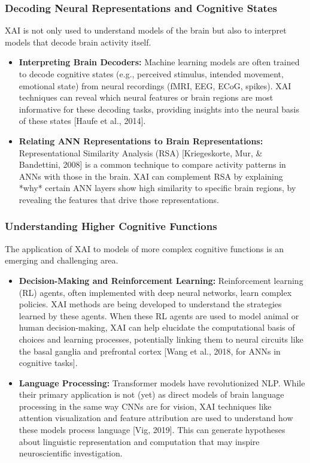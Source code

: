 \documentclass[11pt,a4paper]{article}
\begin{document}
\subsubsection{Decoding Neural Representations and Cognitive States}
XAI is not only used to understand models of the brain but also to interpret models that decode brain activity itself.
\begin{itemize}
    \item \textbf{Interpreting Brain Decoders:} Machine learning models are often trained to decode cognitive states (e.g., perceived stimulus, intended movement, emotional state) from neural recordings (fMRI, EEG, ECoG, spikes). XAI techniques can reveal which neural features or brain regions are most informative for these decoding tasks, providing insights into the neural basis of these states [Haufe et al., 2014].
    \item \textbf{Relating ANN Representations to Brain Representations:} Representational Similarity Analysis (RSA) [Kriegeskorte, Mur, \& Bandettini, 2008] is a common technique to compare activity patterns in ANNs with those in the brain. XAI can complement RSA by explaining *why* certain ANN layers show high similarity to specific brain regions, by revealing the features that drive those representations.
\end{itemize}

\subsubsection{Understanding Higher Cognitive Functions}
The application of XAI to models of more complex cognitive functions is an emerging and challenging area.
\begin{itemize}
    \item \textbf{Decision-Making and Reinforcement Learning:} Reinforcement learning (RL) agents, often implemented with deep neural networks, learn complex policies. XAI methods are being developed to understand the strategies learned by these agents. When these RL agents are used to model animal or human decision-making, XAI can help elucidate the computational basis of choices and learning processes, potentially linking them to neural circuits like the basal ganglia and prefrontal cortex [Wang et al., 2018, for ANNs in cognitive tasks].
    \item \textbf{Language Processing:} Transformer models have revolutionized NLP. While their primary application is not (yet) as direct models of brain language processing in the same way CNNs are for vision, XAI techniques like attention visualization and feature attribution are used to understand how these models process language [Vig, 2019]. This can generate hypotheses about linguistic representation and computation that may inspire neuroscientific investigation.
\end{itemize}
\end{document}
